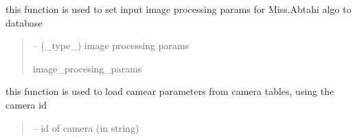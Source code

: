 \documentclass[letterpaper,10pt,english]{sphinxmanual}
\begin{document}
\begin{savenotes}
\begin{fulllineitems}
\begin{savenotes}\begin{fulllineitems}
\label{\detokenize{setting/database_utils:oxin.database_utils.dataBaseUtils.get_dataset_path}}
\pysigstartsignatures
{}
\pysigstopsignatures
\end{fulllineitems}\end{savenotes}


\begin{savenotes}\begin{fulllineitems}
\label{\detokenize{setting/database_utils:oxin.database_utils.dataBaseUtils.get_image_processing_parms}}
\pysigstartsignatures
{}
\pysigstopsignatures
\sphinxAtStartPar
this function is used to set input image processing params for Miss.Abtahi algo to database
\begin{quote}\begin{description}
\sphinxAtStartPar
{} – (\_type\_) image processing params

\sphinxAtStartPar
image\_procesing\_params

\end{description}\end{quote}

\end{fulllineitems}\end{savenotes}


\begin{savenotes}\begin{fulllineitems}
\label{\detokenize{setting/database_utils:oxin.database_utils.dataBaseUtils.load_cam_params}}
\pysigstartsignatures
{}
\pysigstopsignatures
\sphinxAtStartPar
this function is used to load camear parameters from camera tables, using the camera id
\begin{quote}\begin{description}
\sphinxAtStartPar
{} – id of camera (in string)


\end{description}
\end{quote}
\end{fulllineitems}
\end{savenotes}
\end{fulllineitems}
\end{savenotes}
\end{document}
